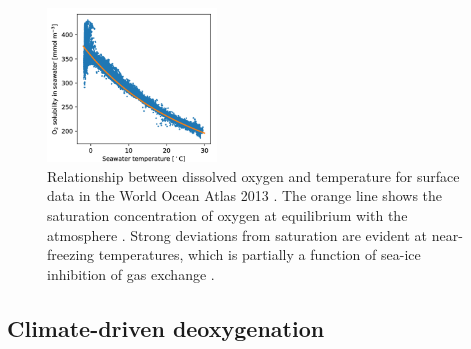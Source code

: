 \documentclass{report_chapter}
\begin{document}
\begin{figure}[tb]
\centering
\includegraphics[width=0.4\textwidth]{o2sol-v-temp.png}
\caption{Relationship between dissolved oxygen and temperature for surface data in the World Ocean Atlas 2013 \citep{Garcia-Locarnini-etal-2014}.
The orange line shows the saturation concentration of oxygen at equilibrium with the atmosphere \protect\citep{Garcia-Gordon-1992}.
Strong deviations from saturation are evident at near-freezing temperatures, which is partially a function of sea-ice inhibition of gas exchange \citep{Ito-Follows-etal-2004}.
}
\label{fig:o2-sol}
\end{figure}

\subsection{Climate-driven deoxygenation}
\end{document}
